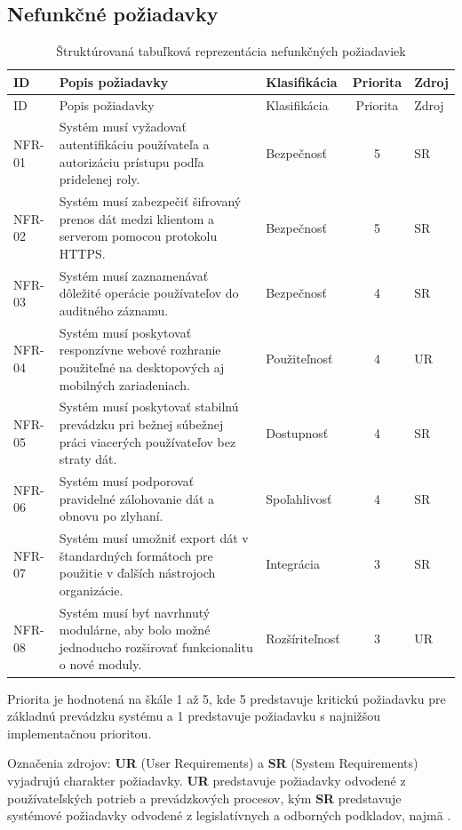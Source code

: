 \subsection{Nefunkčné požiadavky}

\small
\begin{longtable}{|p{1.5cm}|p{5.8cm}|p{2.0cm}|c|p{2.1cm}|}
\caption{Štruktúrovaná tabuľková reprezentácia nefunkčných požiadaviek}\label{tab:nonfunctional-requirements-structured}\\
\hline
ID & Popis požiadavky & Klasifikácia & Priorita & Zdroj \\
\hline
\endfirsthead
\hline
ID & Popis požiadavky & Klasifikácia & Priorita & Zdroj \\
\hline
\endhead
NFR-01 & Systém musí vyžadovať autentifikáciu používateľa a autorizáciu prístupu podľa pridelenej roly. & Bezpečnosť & 5 & SR \\
\hline
NFR-02 & Systém musí zabezpečiť šifrovaný prenos dát medzi klientom a serverom pomocou protokolu HTTPS. & Bezpečnosť & 5 & SR \\
\hline
NFR-03 & Systém musí zaznamenávať dôležité operácie používateľov do auditného záznamu. & Bezpečnosť & 4 & SR \\
\hline
NFR-04 & Systém musí poskytovať responzívne webové rozhranie použiteľné na desktopových aj mobilných zariadeniach. & Použiteľnosť & 4 & UR \\
\hline
NFR-05 & Systém musí poskytovať stabilnú prevádzku pri bežnej súbežnej práci viacerých používateľov bez straty dát. & Dostupnosť & 4 & SR \\
\hline
NFR-06 & Systém musí podporovať pravidelné zálohovanie dát a obnovu po zlyhaní. & Spoľahlivosť & 4 & SR \\
\hline
NFR-07 & Systém musí umožniť export dát v štandardných formátoch pre použitie v ďalších nástrojoch organizácie. & Integrácia & 3 & SR \\
\hline
NFR-08 & Systém musí byť navrhnutý modulárne, aby bolo možné jednoducho rozširovať funkcionalitu o nové moduly. & Rozšíriteľnosť & 3 & UR \\
\hline
\end{longtable}

\noindent
Priorita je hodnotená na škále 1 až 5, kde 5 predstavuje kritickú požiadavku pre základnú prevádzku systému a 1 predstavuje požiadavku s najnižšou implementačnou prioritou.

\noindent
Označenia zdrojov: \textbf{UR} (User Requirements) a \textbf{SR} (System Requirements) vyjadrujú charakter požiadavky. \textbf{UR} predstavuje požiadavky odvodené z používateľských potrieb a prevádzkových procesov, kým \textbf{SR} predstavuje systémové požiadavky odvodené z legislatívnych a odborných podkladov, najmä \cite{EUDWD2020,SKVyhlaska912023,CarricoFerreira2021}.

